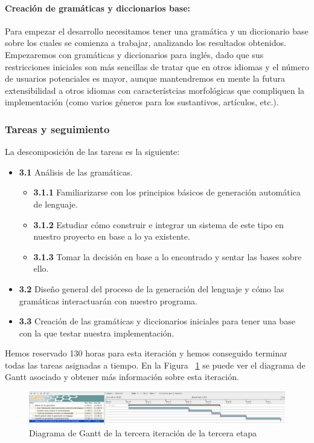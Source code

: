 \paragraph{Creación de gramáticas y diccionarios base:} Para empezar el desarrollo necesitamos tener una gramática y un diccionario base sobre los cuales se comienza a trabajar, analizando los resultados obtenidos. Empezaremos con gramáticas y diccionarios para inglés, dado que sus restricciones iniciales son más sencillas de tratar que en otros idiomas y el número de usuarios potenciales es mayor, aunque mantendremos en mente la futura extensibilidad a otros idiomas con característcias morfológicas que compliquen la implementación (como varios géneros para los sustantivos, artículos, etc.).

\subsubsection{Tareas y seguimiento}

La descomposición de las tareas es la siguiente:

\begin{itemize}
  \item \textbf{3.1} Análisis de las gramáticas.
    \begin{itemize}
      \item \textbf{3.1.1} Familiarizarse con los principios básicos de generación automática de lenguaje.
      \item \textbf{3.1.2} Estudiar cómo construir e integrar un sistema de este tipo en nuestro proyecto en base a lo ya existente.
      \item \textbf{3.1.3} Tomar la decisión en base a lo encontrado y sentar las bases sobre ello.
    \end{itemize}
  \item \textbf{3.2} Diseño general del proceso de la generación del lenguaje y cómo las gramáticas interactuarán con nuestro programa.
  \item \textbf{3.3} Creación de las gramáticas y diccionarios iniciales para tener una base con la que testar nuestra implementación.
\end{itemize}

\noindent Hemos reservado 130 horas para esta iteración y hemos conseguido terminar todas las tareas asignadas a tiempo. En la Figura ~\ref{fig:sec3it3} se puede ver el diagrama de Gantt asociado y obtener más información sobre esta iteración.

\begin{figure}
    \includegraphics[width=\textwidth,height=\textheight,keepaspectratio]{./img/sec3it3.png}
  \caption{Diagrama de Gantt de la tercera iteración de la tercera etapa}
  \label{fig:sec3it3}
\end{figure}

